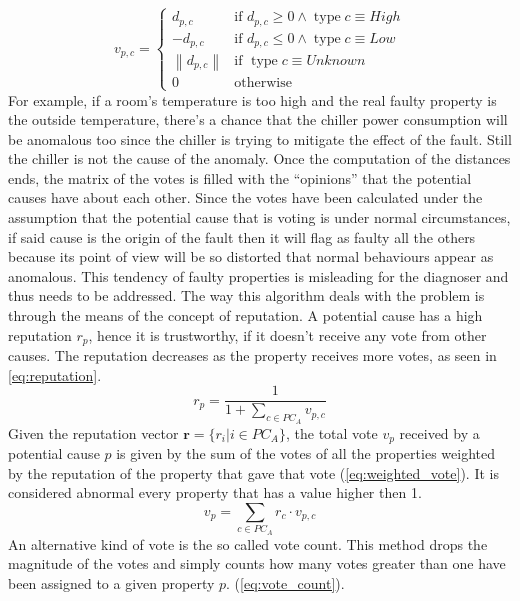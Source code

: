 \begin{equation}
  \label{eq:vote}
  v_{p,c}=\begin{cases}
    d_{p,c} & \text{if } d_{p,c}\geq 0 \land \operatorname{type}c\equiv High \\
    -d_{p,c} & \text{if } d_{p,c}\leq 0 \land \operatorname{type}c\equiv Low \\
    \left\lVert d_{p,c}\right\rVert & \text{if } \operatorname{type}c\equiv Unknown \\
    0 & \text{otherwise}
\end{cases}
\end{equation}
For example, if a room's temperature is too high and the real faulty property is the outside temperature, there's a chance that the chiller power consumption will be anomalous too since the chiller is trying to mitigate the effect of the fault. Still the chiller is not the cause of the anomaly. Once the computation of the distances ends, the matrix of the votes is filled with the ``opinions'' that the potential causes have about each other. Since the votes have been calculated under the assumption that the potential cause that is voting is under normal circumstances, if said cause is the origin of the fault then it will flag as faulty all the others because its point of view will be so distorted that normal behaviours appear as anomalous. This tendency of faulty properties is misleading for the diagnoser and thus needs to be addressed. The way this algorithm deals with the problem is through the means of the concept of reputation. A potential cause has a high reputation $r_p$, hence it is trustworthy, if it doesn't receive any vote from other causes. The reputation decreases as the property receives more votes, as seen in \autoref{eq:reputation}.
\begin{equation}
  \label{eq:reputation}
  r_p=\frac{1}{1+\sum\limits_{c\in PC_A}v_{p,c}}
\end{equation}
Given the reputation vector $\bm r=\{r_i|i\in PC_A\}$, the total vote $v_p$ received by a potential cause $p$ is given by the sum of the votes of all the properties weighted by the reputation of the property that gave that vote (\autoref{eq:weighted_vote}). It is considered abnormal every property that has a value higher then 1.
\begin{equation}
  \label{eq:weighted_vote}
  v_p=\sum\limits_{c\in PC_A}r_c\cdot v_{p,c}
\end{equation}
An alternative kind of vote is the so called vote count. This method drops the magnitude of the votes and simply counts how many votes greater than one have been assigned to a given property $p$. (\autoref{eq:vote_count}).
